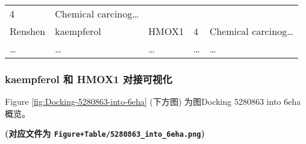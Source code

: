 \documentclass[
]{article}
\begin{document}
\begin{longtable}[]{@{}lllll@{}}
\begin{minipage}[t]{0.19\columnwidth}
4\strut
\end{minipage} & \begin{minipage}[t]{0.21\columnwidth}\raggedright
Chemical carcinog\ldots{}\strut
\end{minipage}\tabularnewline
\begin{minipage}[t]{0.17\columnwidth}\raggedright
Renshen\strut
\end{minipage} & \begin{minipage}[t]{0.16\columnwidth}\raggedright
kaempferol\strut
\end{minipage} & \begin{minipage}[t]{0.12\columnwidth}\raggedright
HMOX1\strut
\end{minipage} & \begin{minipage}[t]{0.19\columnwidth}\raggedright
4\strut
\end{minipage} & \begin{minipage}[t]{0.21\columnwidth}\raggedright
Chemical carcinog\ldots{}\strut
\end{minipage}\tabularnewline
\begin{minipage}[t]{0.17\columnwidth}\raggedright
\ldots{}\strut
\end{minipage} & \begin{minipage}[t]{0.16\columnwidth}\raggedright
\ldots{}\strut
\end{minipage} & \begin{minipage}[t]{0.12\columnwidth}\raggedright
\ldots{}\strut
\end{minipage} & \begin{minipage}[t]{0.19\columnwidth}\raggedright
\ldots{}\strut
\end{minipage} & \begin{minipage}[t]{0.21\columnwidth}\raggedright
\ldots{}\strut
\end{minipage}\tabularnewline
\bottomrule
\end{longtable}

\hypertarget{kaempferol-ux548c-hmox1-ux5bf9ux63a5ux53efux89c6ux5316}{%
\subsubsection{kaempferol 和 HMOX1 对接可视化}\label{kaempferol-ux548c-hmox1-ux5bf9ux63a5ux53efux89c6ux5316}}

Figure \ref{fig:Docking-5280863-into-6eha} (下方图) 为图Docking 5280863 into 6eha概览。

\textbf{(对应文件为 \texttt{Figure+Table/5280863\_into\_6eha.png})}
\end{document}
